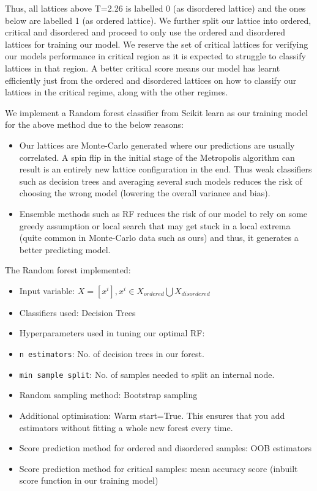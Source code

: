 Thus, all lattices above T=2.26 is labelled 0 (as disordered lattice) and the ones below are labelled 1 (as ordered lattice). We further split our lattice into ordered, critical and disordered and proceed to only use the ordered and disordered lattices for training our model. We reserve the set of critical lattices for verifying our models performance in critical region as it is expected to struggle to classify lattices in that region. A better critical score means our model has learnt efficiently just from the ordered and disordered lattices on how to classify our lattices in the critical regime, along with the other regimes.

We implement a Random forest classifier from Scikit learn as our training model for the above method due to the below reasons:
\begin{itemize}
    \item Our lattices are Monte-Carlo generated where our predictions are usually correlated. A spin flip in the initial stage of the Metropolis algorithm can result is an entirely new lattice configuration in the end. Thus weak classifiers such as decision trees and averaging several such models reduces the risk of choosing the wrong model (lowering the overall variance and bias).
    \item Ensemble methods such as RF reduces the risk of our model to rely on some greedy assumption or local search that may get stuck in a local extrema (quite common in Monte-Carlo data such as ours) and thus, it generates a better predicting model.
\end{itemize}

The Random forest implemented:
\begin{itemize}
    \item Input variable: \(X=[x^i],x^i\in {X_{ordered}\bigcup X_{disordered}}\)
    \item Classifiers used: Decision Trees
    \item Hyperparameters used in tuning our optimal RF:
        \item \texttt{n estimators}: No. of decision trees in our forest.
        \item \texttt{min sample split}: No. of samples needed to split an internal node.
    \item Random sampling method: Bootstrap sampling
    \item Additional optimisation: Warm start=True. This ensures that you add estimators without fitting a whole new forest every time.
    \item Score prediction method for ordered and disordered samples: OOB estimators
    \item Score prediction method for critical samples: mean accuracy score (inbuilt score function in our training model)
\end{itemize}

